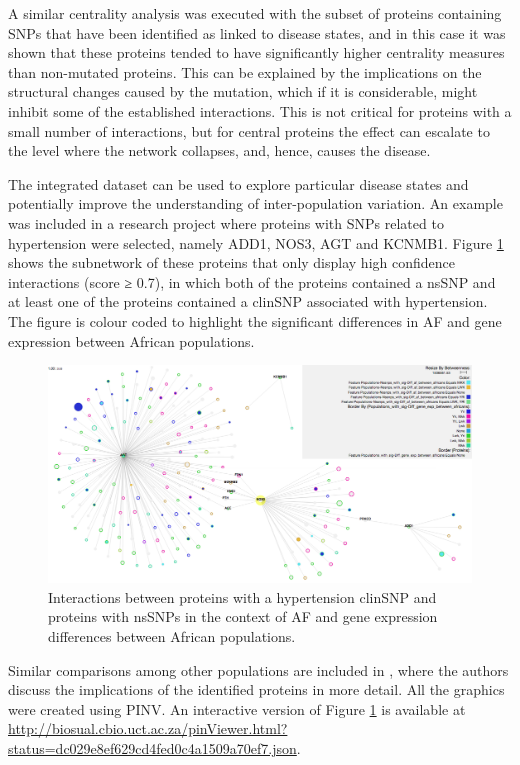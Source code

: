 A similar centrality analysis was executed with the subset of proteins containing SNPs that have been identified as linked to disease states, and in this case it was shown that these proteins tended to have significantly higher centrality measures than non-mutated proteins. This can be explained by the implications on the structural changes caused by the mutation, which if it is considerable, might inhibit some of the established interactions. This is not critical for proteins with a small number of interactions, but for central proteins the effect can escalate to the level where the network collapses, and, hence, causes the disease.

The integrated dataset can be used to explore particular disease states and potentially improve the understanding of inter-population variation. An example was included in a research project where proteins with SNPs related to hypertension were selected, namely ADD1, NOS3, AGT and KCNMB1. Figure \ref{fig:pinv_human_snps} shows the subnetwork of these proteins that only display high confidence interactions (score ≥ 0.7), in which both of the proteins contained a nsSNP and at least one of the proteins contained a clinSNP  associated with hypertension. The figure is colour coded to highlight the significant differences in AF and gene expression between African populations. 

\begin{figure}
\centering
\includegraphics[width=\textwidth]{figures/pinv_human_snps.png}
\caption[Interactions between proteins with a hypertension clinSNP]{Interactions between proteins with a hypertension clinSNP and proteins with nsSNPs in the context of AF and gene expression differences between African populations.
\label{fig:pinv_human_snps}}
\end{figure}

Similar comparisons among other populations are included in \cite{HEE2014}, where the authors discuss the implications of the identified proteins in more detail. All the graphics were created using PINV. An interactive version of Figure \ref{fig:pinv_human_snps} is available at \url{http://biosual.cbio.uct.ac.za/pinViewer.html?status=dc029e8ef629cd4fed0c4a1509a70ef7.json}.

